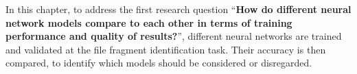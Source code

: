 In this chapter, to address the first research question ``\textbf{How do different neural network models compare to each other in terms of training performance and quality of results?}'', different neural networks are trained and validated at the file fragment identification task. Their accuracy is then compared, to identify which models should be considered or disregarded.
